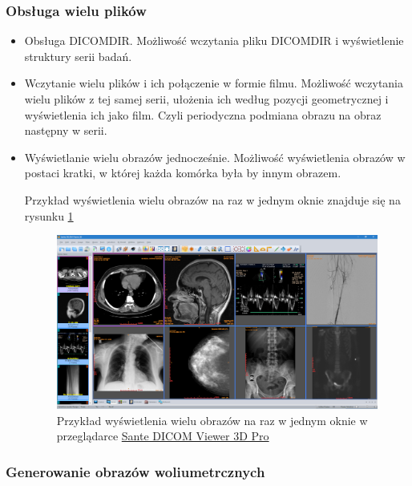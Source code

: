 \subsubsection{Obsługa wielu plików}

\begin{itemize}

      \item Obsługa DICOMDIR.
            Możliwość wczytania pliku DICOMDIR i wyświetlenie struktury serii badań.

      \item Wczytanie wielu plików i ich połączenie w formie filmu.
            Możliwość wczytania wielu plików z tej samej serii, ułożenia ich według pozycji geometrycznej i wyświetlenia ich jako film.
            Czyli periodyczna podmiana obrazu na obraz następny w serii.

      \item Wyświetlanie wielu obrazów jednocześnie.
            Możliwość wyświetlenia obrazów w postaci kratki, w której każda komórka była by innym obrazem.

            Przykład wyświetlenia wielu obrazów na raz w jednym oknie znajduje się na rysunku \ref{fig:dicomviewer001}

            \begin{figure}[!htbp]
                  \centering
                  \includegraphics[width=\textwidth]{img/dicom-viewer-001.png}
                  \caption{Przykład wyświetlenia wielu obrazów na raz w jednym oknie w przeglądarce \href{https://www.santesoft.com/win/sante-dicom-viewer-3d-pro/sante-dicom-viewer-3d-pro.html}{Sante DICOM Viewer 3D Pro}}
                  \label{fig:dicomviewer001}
            \end{figure}
\end{itemize}

\subsubsection{Generowanie obrazów woliumetrcznych}

